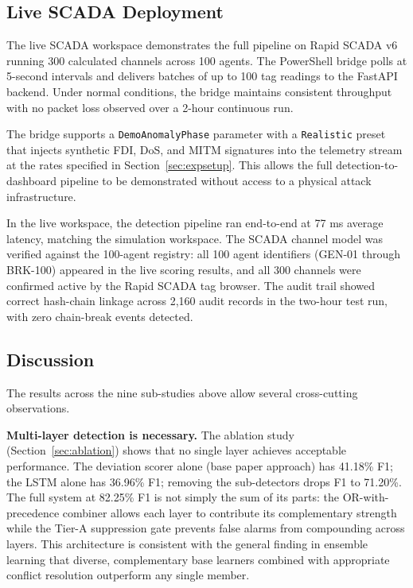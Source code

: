 \subsection{Live SCADA Deployment}
\label{sec:scada_deploy}

The live SCADA workspace demonstrates the full pipeline on Rapid SCADA v6 running 300 calculated
channels across 100 agents. The PowerShell bridge polls at 5-second intervals and delivers batches
of up to 100 tag readings to the FastAPI backend. Under normal conditions, the bridge maintains
consistent throughput with no packet loss observed over a 2-hour continuous run.

The bridge supports a \texttt{DemoAnomalyPhase} parameter with a \texttt{Realistic} preset that
injects synthetic FDI, DoS, and MITM signatures into the telemetry stream at the rates specified
in Section~\ref{sec:expsetup}. This allows the full detection-to-dashboard pipeline to be
demonstrated without access to a physical attack infrastructure.

In the live workspace, the detection pipeline ran end-to-end at 77 ms average latency, matching
the simulation workspace. The SCADA channel model was verified against the 100-agent registry:
all 100 agent identifiers (GEN-01 through BRK-100) appeared in the live scoring results, and all
300 channels were confirmed active by the Rapid SCADA tag browser. The audit trail showed correct
hash-chain linkage across 2,160 audit records in the two-hour test run, with zero chain-break
events detected.

\subsection{Discussion}
\label{sec:discussion}

The results across the nine sub-studies above allow several cross-cutting observations.

\textbf{Multi-layer detection is necessary.} The ablation study (Section~\ref{sec:ablation}) shows
that no single layer achieves acceptable performance. The deviation scorer alone (base paper
approach) has 41.18\% F1; the LSTM alone has 36.96\% F1; removing the sub-detectors drops F1 to
71.20\%. The full system at 82.25\% F1 is not simply the sum of its parts: the OR-with-precedence
combiner allows each layer to contribute its complementary strength while the Tier-A suppression
gate prevents false alarms from compounding across layers. This architecture is consistent with
the general finding in ensemble learning that diverse, complementary base learners combined with
appropriate conflict resolution outperform any single member.

